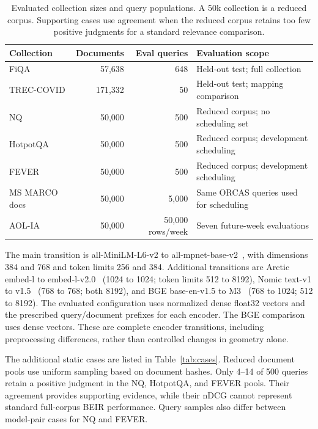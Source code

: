 \documentclass[runningheads]{llncs}
\begin{document}
\begin{table}[t]
\caption{Evaluated collection sizes and query populations. A 50k collection is a reduced corpus. Supporting cases use agreement when the reduced corpus retains too few positive judgments for a standard relevance comparison.}
\label{tab:data}
\centering
\small
\setlength{\tabcolsep}{3pt}
\begin{tabular}{@{}lrr>{\raggedright\arraybackslash}p{4.7cm}@{}}
\toprule
Collection & Documents & Eval queries & Evaluation scope \\
\midrule
FiQA & 57,638 & 648 & Held-out test; full collection \\
TREC-COVID & 171,332 & 50 & Held-out test; mapping comparison \\
NQ & 50,000 & 500 & Reduced corpus; no scheduling set \\
HotpotQA & 50,000 & 500 & Reduced corpus; development scheduling \\
FEVER & 50,000 & 500 & Reduced corpus; development scheduling \\
MS MARCO docs & 50,000 & 5,000 & Same ORCAS queries used for scheduling \\
AOL-IA & 50,000 & 50,000 rows/week & Seven future-week evaluations \\
\bottomrule
\end{tabular}
\end{table}

The main transition is all-MiniLM-L6-v2 to all-mpnet-base-v2~\cite{minilm}, with dimensions 384 and 768 and token limits 256 and 384. Additional transitions are Arctic embed-l to embed-l-v2.0~\cite{arctic} (1024 to 1024; token limits 512 to 8192), Nomic text-v1 to v1.5~\cite{nomic} (768 to 768; both 8192), and BGE base-en-v1.5 to M3~\cite{bge} (768 to 1024; 512 to 8192). The evaluated configuration uses normalized dense float32 vectors and the prescribed query/document prefixes for each encoder. The BGE comparison uses dense vectors. These are complete encoder transitions, including preprocessing differences, rather than controlled changes in geometry alone.

The additional static cases are listed in Table~\ref{tab:cases}. Reduced document pools use uniform sampling based on document hashes. Only 4--14 of 500 queries retain a positive judgment in the NQ, HotpotQA, and FEVER pools. Their agreement provides supporting evidence, while their nDCG cannot represent standard full-corpus BEIR performance. Query samples also differ between model-pair cases for NQ and FEVER.
\end{document}

